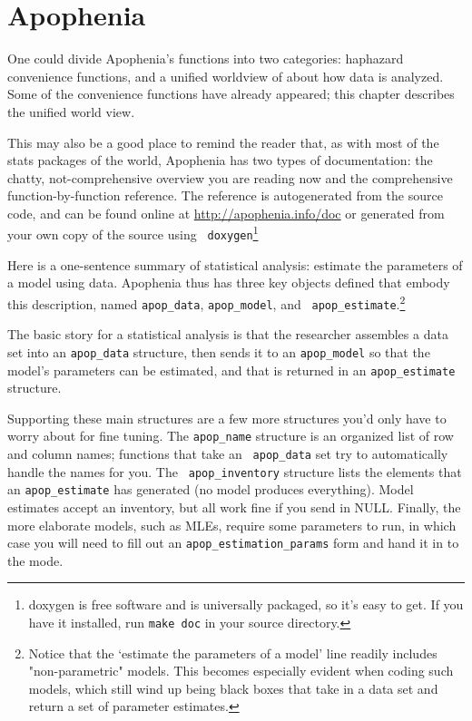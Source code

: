 \chapter{Apophenia}

One could divide Apophenia's functions into two categories: haphazard
convenience functions, and a unified worldview of about how data is
analyzed. Some of the convenience functions have already appeared; this
chapter describes the unified world view. 

This may also be a good place to remind the reader that, as with most of
the stats packages of the world, Apophenia has two types of
documentation: the chatty, not-comprehensive overview you are reading now and the
comprehensive function-by-function reference. The reference is autogenerated from the
source code, and can be found online at \url{http://apophenia.info/doc}
or generated from your own copy of the source using {\tt
doxygen}\footnote{doxygen is free software and is universally packaged,
so it's easy to get. If you have it installed, run {\tt make doc} in
your source directory.}

Here is a one-sentence summary of statistical analysis: estimate the
parameters of a model
using data. Apophenia thus has three key objects defined that embody
this description, named {\tt apop\_data}, {\tt apop\_model}, and {\tt
apop\_estimate}.\footnote{Notice that the `estimate the parameters of a
model' line readily includes "non-parametric" models. This becomes
especially evident when coding such models, which still wind up being
black boxes that take in a data set and return a set of parameter
estimates.}

The basic story for a statistical analysis is that the researcher
assembles a data set into an {\tt apop\_data} structure, then sends it to
an {\tt apop\_model} so that the model's parameters can be estimated,
and that is returned in an {\tt apop\_estimate} structure.

Supporting these main structures are a few more structures you'd only
have to worry about for fine tuning.  The {\tt apop\_name} structure is
an organized list of row and column names; functions that take an {\tt
apop\_data} set try to automatically handle the names for you.  The {\tt
apop\_inventory} structure lists the elements that an {\tt apop\_estimate}
has generated (no model produces everything). Model estimates accept
an inventory, but all work fine if you send in NULL. Finally, the more
elaborate models, such as MLEs, require some parameters to run, in
which case you will need to fill out an {\tt apop\_estimation\_params}
form and hand it in to the mode.


